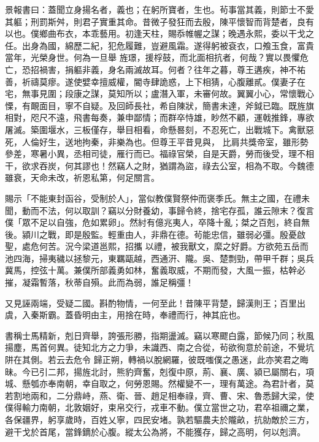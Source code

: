 \begin{pinyinscope}
 景報書曰：蓋聞立身揚名者，義也；在躬所寶者，生也。茍事當其義，則節士不愛其軀；刑罰斯舛，則君子實重其命。昔微子發狂而去殷，陳平懷智而背楚者，良有以也。僕鄉曲布衣，本乖藝用。初逢天柱，賜忝帷幄之謀；晚遇永熙，委以干戈之任。出身為國，綿歷二紀，犯危履難，豈避風霜。遂得躬被袞衣，口飧玉食，富貴當年，光榮身世。何為一旦舉
 旌璟，援桴鼓，而北面相抗者，何哉？實以畏懼危亡，恐招禍害，捐軀非義，身名兩滅故耳。何者？往年之暮，尊王遘疾，神不祐善，祈禱莫瘳。遂使嬖幸擅威權，閽寺肆詭惑，上下相猜，心腹離貳。僕妻子在宅，無事見圍；段康之謀，莫知所以；盧潛入軍，未審何故。翼翼小心，常懷戰心慄，有靦面目，寧不自疑。及回師長社，希自陳狀，簡書未達，斧鉞已臨。既旌旗相對，咫尺不遠，飛書每奏，兼申鄙情；而群卒恃雄，眇然不顧，運戟推鋒，專欲屠滅。築圍堰水，三板僅存，舉目相看，命懸晷刻，不忍死亡，出戰城下。禽獸惡死，人倫好生，送地拘秦，非樂為也。但尊王平昔見與，
 比肩共獎帝室，雖形勢參差，寒暑小異，丞相司徒，雁行而已。福祿官榮，自是天爵，勞而後受，理不相干，欲求吞炭，何其謬也！然竊人之財，猶謂為盜，祿去公室，相為不取。今魏德雖衰，天命未改，祈恩私第，何足關言。



 賜示「不能東封函谷，受制於人」，當似教僕賢祭仲而褒季氏。無主之國，在禮未聞，動而不法，何以取訓？竊以分財養幼，事歸令終，捨宅存孤，誰云隙末？復言僕「眾不足以自強，危如累卵」。然紂有億兆夷人，卒降十亂；桀之百剋，終自無後。潁川之戰，即是殷監。輕重由人，非鼎在德。茍能忠信，雖弱必彊。殷憂啟聖，處危何苦。況今梁道邕熙，招攜
 以禮，被我獸文，縻之好爵。方欲苑五岳而池四海，掃夷穢以拯黎元，東羈甌越，西通汧、隴。吳、楚剽勁，帶甲千群；吳兵冀馬，控弦十萬。兼僕所部義勇如林，奮義取威，不期而發，大風一振，枯幹必摧，凝霜暫落，秋蒂自殞。此而為弱，誰足稱彊！



 又見誣兩端，受疑二國。斟酌物情，一何至此！昔陳平背楚，歸漢則王；百里出虞，入秦斯霸。蓋昏明由主，用捨在時，奉禮而行，神其庇也。



 書稱士馬精新，剋日齊舉，誇張形勝，指期盪滅。竊以寒飂白露，節候乃同；秋風揚塵，馬首何異。徒知北方之力爭，未識西、南之合從，茍欲徇意於前途，不覺坑阱在其側。若云去危令
 歸正朔，轉禍以脫網羅，彼既嗤僕之愚迷，此亦笑君之晦昧。今已引二邦，揚旌北討，熊豹齊奮，剋復中原，荊、襄、廣、潁已屬關右，項城、懸瓠亦奉南朝，幸自取之，何勞恩賜。然權變不一，理有萬途。為君計者，莫若割地兩和，二分鼎峙，燕、衛、晉、趙足相奉祿，齊、曹、宋、魯悉歸大梁，使僕得輸力南朝，北敦姻好，束帛交行，戎車不動。僕立當世之功，君卒祖禰之業，各保疆界，躬享歲時，百姓乂寧，四民安堵。孰若驅農夫於隴畝，抗勍敵於三方，避干戈於首尾，當鋒鏑於心腹。縱太公為將，不能獲存，歸之高明，何以剋濟。




\end{pinyinscope}

